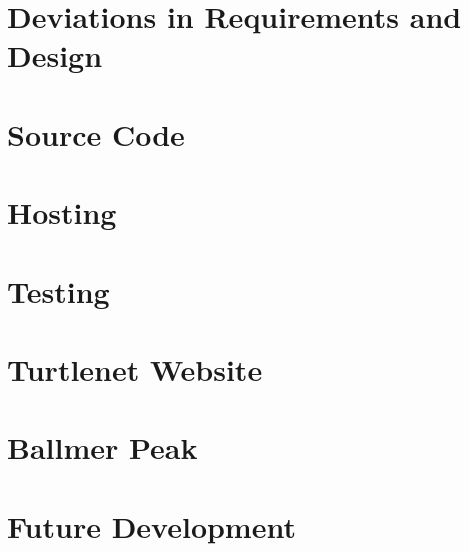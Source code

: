 \chapter{Deviations in Requirements and Design}


\chapter{Source Code}


\chapter{Hosting}


\chapter{Testing}


\chapter{Turtlenet Website}


\chapter{Ballmer Peak}


\chapter{Future Development}

